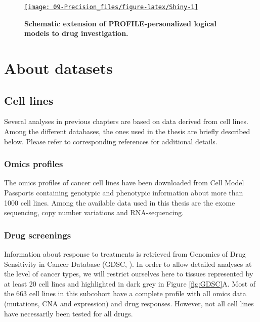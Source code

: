 \documentclass[a4paper,12pt,twoside,onecolumn,openright,final,oldfontcommands]{memoir}
\begin{document}
\begin{figure}

{\centering \href{http://jonasbeal.shinyapps.io/application_causal_pm/}{\texttt{[image: 09-Precision\_files/figure-latex/Shiny-1]} }

}

\caption[Bimodality criteria and their combinations]{\textbf{Schematic extension of PROFILE-personalized
logical models to drug investigation.}}\label{fig:Shiny}
\end{figure}




\appendix {}


\chapter{About datasets}\label{appendix-datasets}

\section{Cell lines}\label{appendix-cl}

Several analyses in previous chapters are based on data derived from
cell lines. Among the different databases, the ones used in the thesis
are briefly described below. Please refer to corresponding references
for additional details.

\subsection{Omics profiles}\label{omics-profiles}

The omics profiles of cancer cell lines have been downloaded from Cell
Model Passports \citep{van2019cell} containing genotypic and phenotypic
information about more than 1000 cell lines. Among the available data
used in this thesis are the exome sequencing, copy number variations and
RNA-sequencing.

\subsection{Drug screenings}\label{appendix-GDSC}

Information about response to treatments is retrieved from Genomics of
Drug Sensitivity in Cancer Database (GDSC, \citet{yang2012genomics}). In
order to allow detailed analyses at the level of cancer types, we will
restrict ourselves here to tissues represented by at least 20 cell lines
and highlighted in dark grey in Figure \ref{fig:GDSC}A. Most of the 663
cell lines in this subcohort have a complete profile with all omics data
(mutations, CNA and expression) and drug responses. However, not all
cell lines have necessarily been tested for all drugs.
\end{document}
